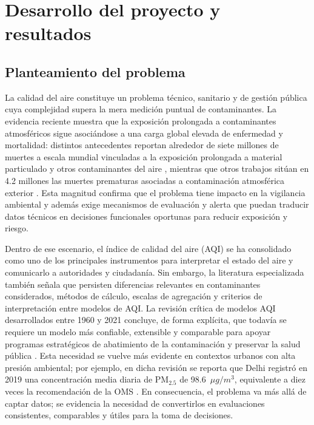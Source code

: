 
\section{Desarrollo del proyecto y resultados}



\subsection{Planteamiento del problema}

La calidad del aire constituye un problema técnico, sanitario y de gestión pública cuya complejidad supera la mera medición puntual de contaminantes. La evidencia reciente muestra que la exposición prolongada a contaminantes atmosféricos sigue asociándose a una carga global elevada de enfermedad y mortalidad: distintos antecedentes reportan alrededor de siete millones de muertes a escala mundial vinculadas a la exposición prolongada a material particulado y otros contaminantes del aire \cite[p.~1]{ART07}, mientras que otros trabajos sitúan en 4.2 millones las muertes prematuras asociadas a contaminación atmosférica exterior \cite[p.~1]{ART04}. Esta magnitud confirma que el problema tiene impacto en la vigilancia ambiental y además exige mecanismos de evaluación y alerta que puedan traducir datos técnicos en decisiones funcionales oportunas para reducir exposición y riesgo.

Dentro de ese escenario, el índice de calidad del aire (AQI) se ha consolidado como uno de los principales instrumentos para interpretar el estado del aire y comunicarlo a autoridades y ciudadanía. Sin embargo, la literatura especializada también señala que persisten diferencias relevantes en contaminantes considerados, métodos de cálculo, escalas de agregación y criterios de interpretación entre modelos de AQI. La revisión crítica de modelos AQI desarrollados entre 1960 y 2021 concluye, de forma explícita, que todavía se requiere un modelo más confiable, extensible y comparable para apoyar programas estratégicos de abatimiento de la contaminación y preservar la salud pública \cite[p.~1]{ART01}. Esta necesidad se vuelve más evidente en contextos urbanos con alta presión ambiental; por ejemplo, en dicha revisión se reporta que Delhi registró en 2019 una concentración media diaria de PM$_{2.5}$ de 98.6~\(\mu g/m^3\), equivalente a diez veces la recomendación de la OMS \cite[p.~2]{ART01}. En consecuencia, el problema va más allá de captar datos; se evidencia la necesidad de convertirlos en evaluaciones consistentes, comparables y útiles para la toma de decisiones.

